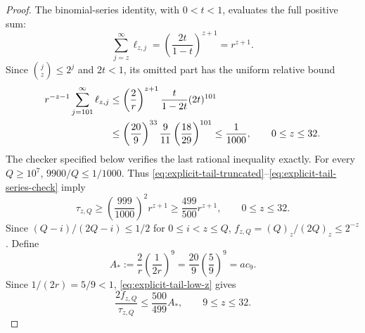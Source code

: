 \documentclass[11pt]{article}
\begin{document}
\begin{proof}
The binomial-series identity, with $0<t<1$, evaluates the full positive sum:
\begin{equation}
 \sum_{j=z}^{\infty}\ell_{z,j}
 =\left(\frac{2t}{1-t}\right)^{z+1}=r^{z+1}.
\end{equation}
Since $\binom jz\le2^j$ and $2t<1$, its omitted part has the uniform
relative bound
\begin{align}
 r^{-z-1}\sum_{j=101}^{\infty}\ell_{z,j}
 &\le\left(\frac2r\right)^{z+1}
       \frac{t}{1-2t}(2t)^{101}\notag\\
 &\le\left(\frac{20}{9}\right)^{33}
       \frac9{11}\left(\frac{18}{29}\right)^{101}
 \le\frac1{1000},\qquad 0\le z\le32.
 \label{eq:explicit-tail-series-check}
\end{align}
The checker specified below verifies the last rational inequality exactly.
For every $Q\ge10^7$, $9900/Q\le1/1000$. Thus
\eqref{eq:explicit-tail-truncated}--\eqref{eq:explicit-tail-series-check}
imply
\begin{equation}\label{eq:explicit-tail-low-z}
 \tau_{z,Q}\ge\left(\frac{999}{1000}\right)^2r^{z+1}
             \ge\frac{499}{500}r^{z+1},\qquad 0\le z\le32.
\end{equation}
Since $(Q-i)/(2Q-i)\le1/2$ for $0\le i<z\le Q$,
$f_{z,Q}=(Q)_z/(2Q)_z\le2^{-z}$. Define
\begin{equation}
 A_*:=\frac2r\left(\frac1{2r}\right)^9
     =\frac{20}{9}\left(\frac59\right)^9=ac_9.
\end{equation}
Since $1/(2r)=5/9<1$, \eqref{eq:explicit-tail-low-z} gives
\begin{equation}\label{eq:explicit-tail-ratio-low}
 \frac{2f_{z,Q}}{\tau_{z,Q}}\le\frac{500}{499}A_*,
 \qquad 9\le z\le32.
\end{equation}


\end{proof}
\end{document}

